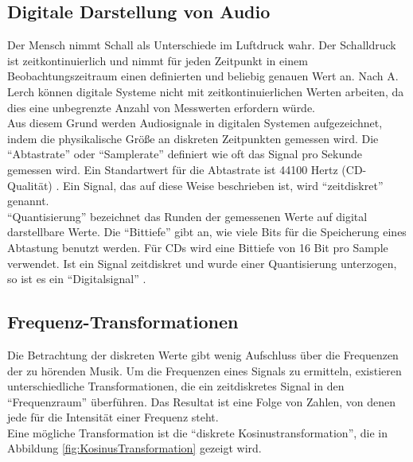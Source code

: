 \documentclass[11pt,a4paper]{article}
\begin{document}
\subsection{Digitale Darstellung von Audio}
Der Mensch nimmt Schall als Unterschiede im Luftdruck wahr. Der Schalldruck ist zeitkontinuierlich und nimmt für jeden Zeitpunkt in einem Beobachtungszeitraum einen definierten und beliebig genauen Wert an. Nach A. Lerch \cite[S. 9]{lerch2012introduction} können digitale Systeme nicht mit zeitkontinuierlichen Werten arbeiten, da dies eine unbegrenzte Anzahl von Messwerten erfordern würde.\\
Aus diesem Grund werden Audiosignale in digitalen Systemen aufgezeichnet, indem die physikalische Größe an diskreten Zeitpunkten gemessen wird. Die ``Abtastrate'' oder ``Samplerate'' definiert wie oft das Signal pro Sekunde gemessen wird. Ein Standartwert für die Abtastrate ist 44100 Hertz (CD-Qualität) \cite[S. 4]{lerch2012introduction}.  Ein Signal, das auf diese Weise beschrieben ist, wird ``zeitdiskret'' genannt.\\
``Quantisierung'' bezeichnet das Runden der gemessenen Werte auf digital darstellbare Werte. Die ``Bittiefe'' gibt an, wie viele Bits für die Speicherung eines Abtastung benutzt werden. Für CDs wird eine Bittiefe von 16 Bit pro Sample verwendet. Ist ein Signal zeitdiskret und wurde einer Quantisierung unterzogen, so ist es ein ``Digitalsignal'' \cite{ZeitdiskretesSignalWiki}.

\subsection{Frequenz-Transformationen}
Die Betrachtung der diskreten Werte gibt wenig Aufschluss über die Frequenzen der zu hörenden Musik. Um die Frequenzen eines Signals zu ermitteln, existieren unterschiedliche Transformationen, die ein zeitdiskretes Signal in den ``Frequenzraum'' überführen. Das Resultat ist eine Folge von Zahlen, von denen jede für die Intensität einer Frequenz steht.\\
Eine mögliche Transformation ist die ``diskrete Kosinustransformation'', die in Abbildung \ref{fig:KosinusTransformation} gezeigt wird.
\end{document}

